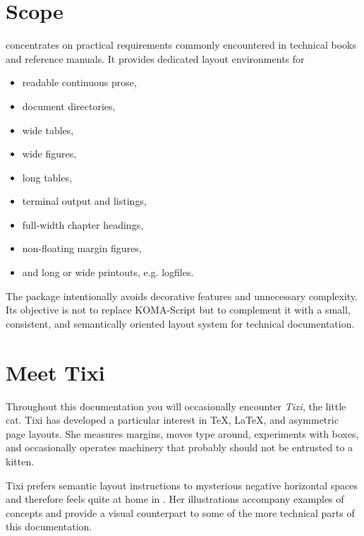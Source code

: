 \documentclass[
11pt,
a4paper,
oneside
]{scrbook}
\begin{document}
\section{Scope}

\MDWordmark concentrates on practical requirements commonly encountered
in technical books and reference manuals.
It provides dedicated layout environments for
\begin{itemize}
	\item readable continuous prose,
	\item document directories,
	\item wide tables,
	\item wide figures,
	\item long tables,
	\item terminal output and listings,
	\item full-width chapter headings,
	\item non-floating margin figures,
	\item and long or wide printouts, e.g. logfiles.
\end{itemize}
The package intentionally avoids decorative features and unnecessary
complexity.
Its objective is not to replace KOMA-Script but to complement it with a small,
consistent, and semantically oriented layout system for technical
documentation.

\section{Meet Tixi}

\begin{SynchronizedMarginAndTextArea}
	\begin{TextInMarginArea}
	\end{TextInMarginArea}
	\begin{TextInTextArea}
		Throughout this documentation you will occasionally encounter
		\emph{Tixi}, the little \MDWordmark cat.
		Tixi has developed a particular interest in \TeX{}, \LaTeX{}, and
		asymmetric page layouts. She measures margins, moves type around,
		experiments with boxes, and occasionally operates machinery that
		probably should not be entrusted to a kitten.
		
		Tixi prefers semantic layout instructions to mysterious negative
		horizontal spaces and therefore feels quite at home in \MDWordmark.
		Her illustrations accompany examples of \MDWordmark concepts and
		provide a visual counterpart to some of the more technical parts of
		this documentation.
	\end{TextInTextArea}
\end{SynchronizedMarginAndTextArea}
\end{document}
